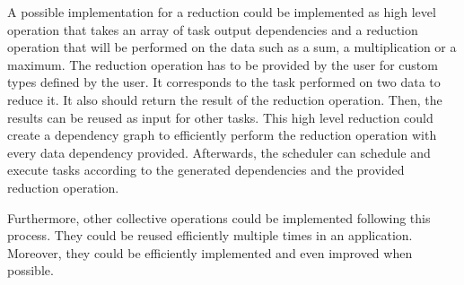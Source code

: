 A possible implementation for a reduction could be implemented as high level operation that takes an array of task output dependencies and a reduction operation that will be performed on the data such as a sum, a multiplication or a maximum.
The reduction operation has to be provided by the user for custom types defined by the user.
It corresponds to the task performed on two data to reduce it.
It also should return the result of the reduction operation.
Then, the results can be reused as input for other tasks.
This high level reduction could create a dependency graph to efficiently perform the reduction operation with every data dependency provided.
Afterwards, the scheduler can schedule and execute tasks according to the generated dependencies and the provided reduction operation.

Furthermore, other collective operations could be implemented following this process.
They could be reused efficiently multiple times in an application.
Moreover, they could be efficiently implemented and even improved when possible.

